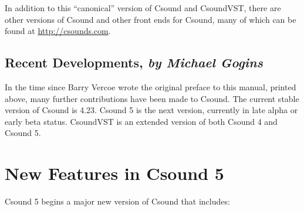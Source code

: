 \documentclass[10pt,letterpaper,onecolumn]{book}
\begin{document}
In addition to this ``canonical'' version of Csound and CsoundVST, there are other versions of Csound and other front ends for Csound, many of which can be found at \url{http://csounds.com}.

\section{Recent Developments, \emph{by Michael Gogins}}

In the time since Barry Vercoe wrote the original preface to this manual, printed above, many further contributions have been made to Csound. The current stable version of Csound is 4.23. Csound 5 is the next version, currently in late alpha or early beta status. CsoundVST is an extended version of both Csound 4 and Csound 5.

\chapter{New Features in Csound 5}

Csound 5 begins a major new version of Csound that includes:
\end{document}
